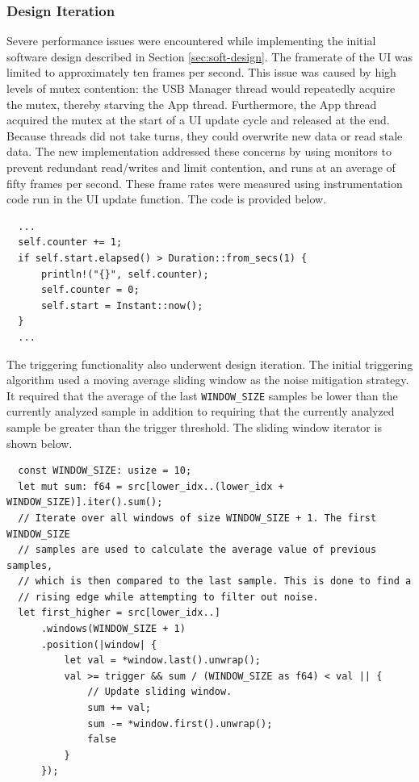 \documentclass[letterpaper,11pt]{article}
\newcommand{\code}[1]{\texttt{#1}}
\begin{document}
\subsubsection{Design Iteration} \label{sec:soft-performance-issues}
Severe performance issues were encountered while implementing the initial
software design described in Section \ref{sec:soft-design}. The framerate of the
UI was limited to approximately ten frames per second. This issue was caused by high
levels of mutex contention: the USB Manager thread would repeatedly acquire the
mutex, thereby starving the App thread. Furthermore, the App thread
acquired the mutex at the start of a UI update cycle and released at the end.
Because threads did not take turns, they could overwrite new data or read stale
data. The new implementation addressed these concerns by using monitors to
prevent redundant read/writes and limit contention, and runs at an average of fifty
frames per second. These frame rates were measured using instrumentation code run
in the UI update function. The code is provided below.

\begin{verbatim}
  ...
  self.counter += 1;
  if self.start.elapsed() > Duration::from_secs(1) {
      println!("{}", self.counter);
      self.counter = 0;
      self.start = Instant::now();
  }
  ...
\end{verbatim}

The triggering functionality also underwent design iteration. The initial
triggering algorithm used a moving average sliding window as the noise
mitigation strategy. It required that the average of the last \code{WINDOW_SIZE}
samples be lower than the currently analyzed sample in addition to requiring that the
currently analyzed sample be greater than the trigger threshold. The sliding window
iterator is shown below.

\begin{verbatim}
  const WINDOW_SIZE: usize = 10;
  let mut sum: f64 = src[lower_idx..(lower_idx + WINDOW_SIZE)].iter().sum();
  // Iterate over all windows of size WINDOW_SIZE + 1. The first WINDOW_SIZE
  // samples are used to calculate the average value of previous samples,
  // which is then compared to the last sample. This is done to find a
  // rising edge while attempting to filter out noise.
  let first_higher = src[lower_idx..]
      .windows(WINDOW_SIZE + 1)
      .position(|window| {
          let val = *window.last().unwrap();
          val >= trigger && sum / (WINDOW_SIZE as f64) < val || {
              // Update sliding window.
              sum += val;
              sum -= *window.first().unwrap();
              false
          }
      });
\end{verbatim}
\end{document}
